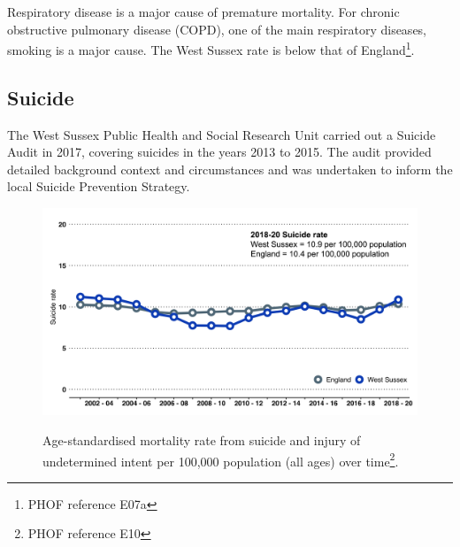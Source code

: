 Respiratory disease is a major cause of premature mortality. For chronic obstructive pulmonary disease (COPD), one of the main respiratory diseases, smoking is a major cause. The West Sussex rate is below that of England\footnote{PHOF reference E07a}.

\subsection{Suicide}
The West Sussex Public Health and Social Research Unit carried out a Suicide Audit in 2017, covering suicides in the years 2013 to 2015. The audit provided detailed background context and circumstances and was undertaken to inform the local Suicide Prevention Strategy.

\begin{figure}[htp]
    \caption[Age-standardised mortality rate from suicide and injury of undetermined intent per 100,000 population (all ages) over time]{Age-standardised mortality rate from suicide and injury of undetermined intent per 100,000 population (all ages) over time\footnote{PHOF reference E10}.}
    \centering
    \includegraphics[width=\linewidth]{images/suicide_line.png}
    \label{fig:suicide}
\end{figure}

